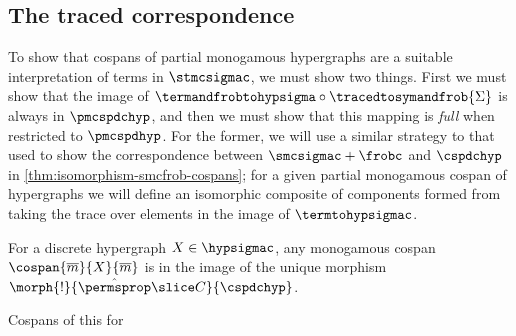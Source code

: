 \subsection{The traced correspondence}

To show that cospans of partial monogamous hypergraphs are a suitable
interpretation of terms in \(\stmcsigmac\), we must show two things.
First we must show that the image of
\(\termandfrobtohypsigma \circ \tracedtosymandfrob{\Sigma}\) is always in
\(\pmcspdchyp\), and then we must show that this mapping is \emph{full} when
restricted to \(\pmcspdhyp\).
For the former, we will use a similar strategy to that used to show the
correspondence between \(\smcsigmac + \frobc\) and \(\cspdchyp\) in
\cref{thm:isomorphism-smcfrob-cospans}; for a given partial monogamous cospan of
hypergraphs we will define an isomorphic composite of components formed from
taking the trace over elements in the image of \(\termtohypsigmac\).

\begin{corollary}
    For a discrete hypergraph \(X \in \hypsigmac\), any monogamous cospan
    \(\cospan{\overline{m}}{X}{\overline{m}}\) is in the image of the unique
    morphism \(\morph{!}{\hat{\permsprop} \slice C}{\cspdchyp}\).
\end{corollary}

Cospans of this for

